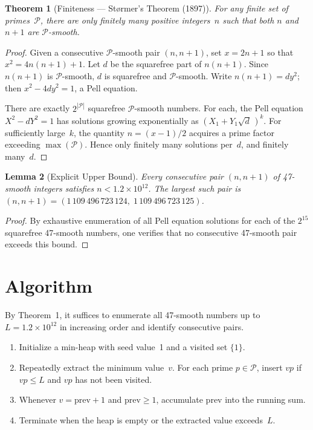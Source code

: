 \documentclass[12pt]{article}
\newtheorem{theorem}{Theorem}
\newtheorem{lemma}[theorem]{Lemma}
\theoremstyle{definition}
\begin{document}
\begin{theorem}[Finiteness --- St\o rmer's Theorem (1897)]
For any finite set of primes~$\mathcal{P}$, there are only finitely many positive integers~$n$ such that both $n$ and $n+1$ are $\mathcal{P}$-smooth.
\end{theorem}

\begin{proof}
Given a consecutive $\mathcal{P}$-smooth pair $(n, n+1)$, set $x = 2n+1$ so that $x^2 = 4n(n+1) + 1$. Let $d$ be the squarefree part of $n(n+1)$. Since $n(n+1)$ is $\mathcal{P}$-smooth, $d$ is squarefree and $\mathcal{P}$-smooth. Write $n(n+1) = dy^2$; then $x^2 - 4dy^2 = 1$, a Pell equation.

There are exactly $2^{|\mathcal{P}|}$ squarefree $\mathcal{P}$-smooth numbers. For each, the Pell equation $X^2 - dY^2 = 1$ has solutions growing exponentially as $(X_1 + Y_1\sqrt{d}\,)^k$. For sufficiently large~$k$, the quantity $n = (x-1)/2$ acquires a prime factor exceeding $\max(\mathcal{P})$. Hence only finitely many solutions per~$d$, and finitely many~$d$.
\end{proof}

\begin{lemma}[Explicit Upper Bound]
Every consecutive pair $(n, n+1)$ of 47-smooth integers satisfies $n < 1.2 \times 10^{12}$. The largest such pair is $(n, n+1) = (1\,109\,496\,723\,124,\; 1\,109\,496\,723\,125)$.
\end{lemma}

\begin{proof}
By exhaustive enumeration of all Pell equation solutions for each of the $2^{15}$ squarefree 47-smooth numbers, one verifies that no consecutive 47-smooth pair exceeds this bound.
\end{proof}

\section{Algorithm}

By Theorem~1, it suffices to enumerate all 47-smooth numbers up to $L = 1.2 \times 10^{12}$ in increasing order and identify consecutive pairs.

\begin{enumerate}
\item Initialize a min-heap with seed value~1 and a visited set $\{1\}$.
\item Repeatedly extract the minimum value~$v$. For each prime $p \in \mathcal{P}$, insert $vp$ if $vp \le L$ and $vp$ has not been visited.
\item Whenever $v = \mathrm{prev} + 1$ and $\mathrm{prev} \ge 1$, accumulate $\mathrm{prev}$ into the running sum.
\item Terminate when the heap is empty or the extracted value exceeds~$L$.
\end{enumerate}
\end{document}

